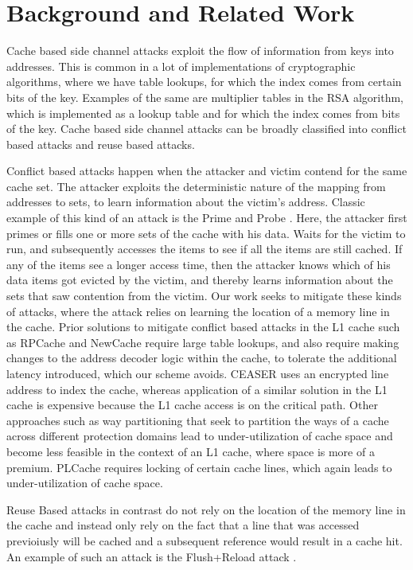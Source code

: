 \section{Background and Related Work}
Cache based side channel attacks exploit the flow of information from keys into addresses. This is common in a lot of implementations of cryptographic algorithms, where we have table lookups, for which the index comes from certain bits of the key. Examples of the same are multiplier tables in the RSA algorithm, which is implemented as a lookup table and for which the index comes from bits of the key. \cite{rfill}
Cache based side channel attacks can be broadly classified into conflict based attacks and reuse based attacks.

Conflict based attacks happen when the attacker and victim contend for the same cache set. The attacker exploits the deterministic nature of the mapping from addresses to sets, to learn information about the victim's address. Classic example of this kind of an attack is the Prime and Probe \cite{p+p}. Here, the attacker first primes or fills one or more sets of the cache with his data. Waits for the victim to run, and subsequently accesses the items to see if all the items are still cached. If any of the items see a longer access time, then the attacker knows which of his data items got evicted by the victim, and thereby learns information about the sets that saw contention from the victim. Our work seeks to mitigate these kinds of attacks, where the attack relies on learning the location of a memory line in the cache. 
Prior solutions to mitigate conflict based attacks in the L1 cache such as RPCache \cite{RPCache} and NewCache \cite{NewCache} require large table lookups, and also require making changes to the address decoder logic within the cache, to tolerate the additional latency introduced, which our scheme avoids. CEASER \cite{ceaser} uses an encrypted line address to index the cache, whereas application of a similar solution in the L1 cache is expensive because the L1 cache access is on the critical path. Other approaches such as way partitioning that seek to partition the ways of a cache across different protection domains \cite{NoMo, DAWG} lead to under-utilization of cache space and become less feasible in the context of an L1 cache, where space is  more of a premium. PLCache \cite{PLCache} requires locking of certain cache lines, which again leads to under-utilization of cache space.

Reuse Based attacks in contrast do not rely on the location of the memory line in the cache and instead only rely on the fact that a line that was accessed previoiusly will be cached and a subsequent reference would result in a cache hit. An example of such an attack is the Flush+Reload attack \cite{F+F}. 
